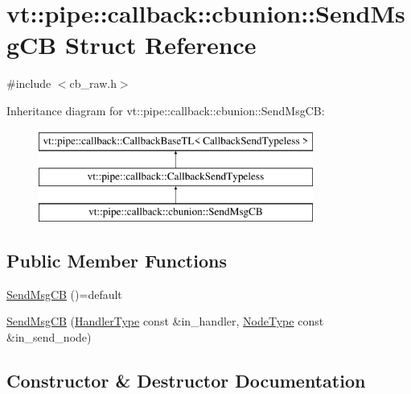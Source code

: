 \hypertarget{structvt_1_1pipe_1_1callback_1_1cbunion_1_1_send_msg_c_b}{}\section{vt\+:\+:pipe\+:\+:callback\+:\+:cbunion\+:\+:Send\+Msg\+CB Struct Reference}
\label{structvt_1_1pipe_1_1callback_1_1cbunion_1_1_send_msg_c_b}


{\ttfamily \#include $<$cb\+\_\+raw.\+h$>$}

Inheritance diagram for vt\+:\+:pipe\+:\+:callback\+:\+:cbunion\+:\+:Send\+Msg\+CB\+:\begin{figure}[H]
\begin{center}
\leavevmode
\includegraphics[height=3.000000cm]{structvt_1_1pipe_1_1callback_1_1cbunion_1_1_send_msg_c_b}
\end{center}
\end{figure}
\subsection*{Public Member Functions}
\begin{DoxyCompactItemize}
\item 
\hyperlink{structvt_1_1pipe_1_1callback_1_1cbunion_1_1_send_msg_c_b_aeff567bb0ba46e5eabf67c9bab9ff331}{Send\+Msg\+CB} ()=default
\item 
\hyperlink{structvt_1_1pipe_1_1callback_1_1cbunion_1_1_send_msg_c_b_a8c24c563a6b877b011acbd95abb92fbd}{Send\+Msg\+CB} (\hyperlink{namespacevt_af64846b57dfcaf104da3ef6967917573}{Handler\+Type} const \&in\+\_\+handler, \hyperlink{namespacevt_a866da9d0efc19c0a1ce79e9e492f47e2}{Node\+Type} const \&in\+\_\+send\+\_\+node)
\end{DoxyCompactItemize}


\subsection{Constructor \& Destructor Documentation}
\mbox{\label{structvt_1_1pipe_1_1callback_1_1cbunion_1_1_send_msg_c_b_aeff567bb0ba46e5eabf67c9bab9ff331}} 
